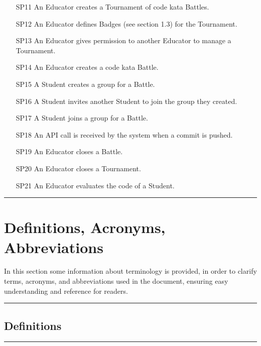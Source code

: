 \documentclass{Configuration_Files/Template}
\begin{document}
\begin{enumerate}
    \item[\textcolor{bluepoli}{SP11}] An Educator creates a Tournament of code kata Battles.
    \item[\textcolor{bluepoli}{SP12}] An Educator defines Badges (see section 1.3) for the Tournament.
    \item[\textcolor{bluepoli}{SP13}] An Educator gives permission to another Educator to manage a Tournament.
    \item[\textcolor{bluepoli}{SP14}] An Educator creates a code kata Battle.
    \item[\textcolor{bluepoli}{SP15}] A Student creates a group for a Battle.
    \item[\textcolor{bluepoli}{SP16}] A Student invites another Student to join the group they created.
    \item[\textcolor{bluepoli}{SP17}] A Student joins a group for a Battle.
    \item[\textcolor{bluepoli}{SP18}] An API call is received by the system when a commit is pushed.
    \item[\textcolor{bluepoli}{SP19}] An Educator closes a Battle.
    \item[\textcolor{bluepoli}{SP20}] An Educator closes a Tournament.
    \item[\textcolor{bluepoli}{SP21}] An Educator evaluates the code of a Student.
\end{enumerate}

{\color{bluepoli}\rule{\linewidth}{0.1pt}}

\section{Definitions, Acronyms, Abbreviations}

In this section some information about terminology is provided, in order to clarify terms, acronyms, and abbreviations used in the document, ensuring easy understanding and reference for readers.

{\color{bluepoli}\rule{\linewidth}{0.1pt}}

\subsection{Definitions}

{\color{bluepoli}\rule{\linewidth}{0.1pt}}
\end{document}

